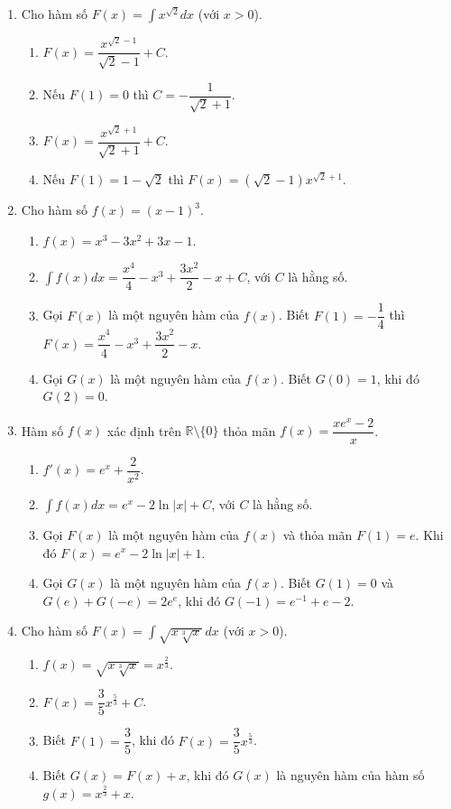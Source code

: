 \documentclass[12pt]{article}
\begin{document}
\begin{enumerate}[label=\textbf{Câu \arabic*.}, start=1]
		\item Cho hàm số $F(x) = \displaystyle \int x^{\sqrt{2}} dx$ (với $x > 0$).
		\begin{enumerate}[label=\alph*)]
			\item $F(x) = \dfrac{x^{\sqrt{2}-1}}{\sqrt{2}-1} + C$.
			\item Nếu $F(1) = 0$ thì $C = -\dfrac{1}{\sqrt{2}+1}$.
			\item $F(x) = \dfrac{x^{\sqrt{2}+1}}{\sqrt{2}+1} + C$.
			\item Nếu $F(1) = 1 - \sqrt{2}$ thì $F(x) = (\sqrt{2}-1)x^{\sqrt{2}+1}$.
		\end{enumerate}
		
		\item Cho hàm số $f(x) = (x - 1)^3$.
		\begin{enumerate}[label=\alph*)]
			\item $f(x) = x^3 - 3x^2 + 3x - 1$.
			\item $\displaystyle \int f(x) dx = \dfrac{x^4}{4} - x^3 + \dfrac{3x^2}{2} - x + C$, với $C$ là hằng số.
			\item Gọi $F(x)$ là một nguyên hàm của $f(x)$. Biết $F(1) = -\dfrac{1}{4}$ thì $F(x) = \dfrac{x^4}{4} - x^3 + \dfrac{3x^2}{2} - x$.
			\item Gọi $G(x)$ là một nguyên hàm của $f(x)$. Biết $G(0) = 1$, khi đó $G(2) = 0$.
		\end{enumerate}
		
		\item Hàm số $f(x)$ xác định trên $\mathbb{R} \setminus \{0\}$ thỏa mãn $f(x) = \dfrac{x e^x - 2}{x}$.
		\begin{enumerate}[label=\alph*)]
			\item $f'(x) = e^x + \dfrac{2}{x^2}$.
			\item $\displaystyle \int f(x) dx = e^x - 2\ln|x| + C$, với $C$ là hằng số.
			\item Gọi $F(x)$ là một nguyên hàm của $f(x)$ và thỏa mãn $F(1) = e$. Khi đó $F(x) = e^x - 2\ln|x| + 1$.
			\item Gọi $G(x)$ là một nguyên hàm của $f(x)$. Biết $G(1) = 0$ và $G(e) + G(-e) = 2e^e$, khi đó $G(-1) = e^{-1} + e - 2$.
		\end{enumerate}
		
		\item Cho hàm số $F(x) = \displaystyle \int \sqrt{x\sqrt[3]{x}} \,dx$ (với $x > 0$).
		\begin{enumerate}[label=\alph*)]
			\item $f(x) = \sqrt{x\sqrt[3]{x}} = x^{\frac{2}{3}}$.
			\item $F(x) = \dfrac{3}{5} x^{\frac{5}{3}} + C$.
			\item Biết $F(1) = \dfrac{3}{5}$, khi đó $F(x) = \dfrac{3}{5} x^{\frac{5}{3}}$.
			\item Biết $G(x) = F(x) + x$, khi đó $G(x)$ là nguyên hàm của hàm số $g(x) = x^{\frac{2}{3}} + x$.
		\end{enumerate}
		

\end{enumerate}
\end{document}

